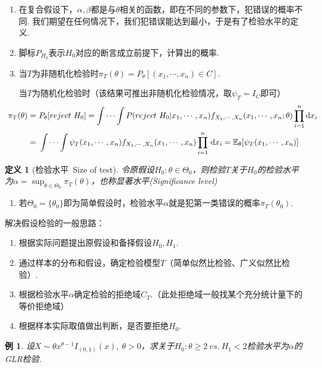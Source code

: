 \documentclass[12pt, a4paper, oneside]{ctexart}
\newtheorem{example}{例}[section]  %
\newtheorem{definition}[theorem]{定义}
\numberwithin{equation}{section}  %
\newenvironment{remark}{\begin{enumerate}[label=\textbf{注\arabic*.}]}{\end{enumerate}}
\let\geq=\geqslant %
\def\E{\mathbb{E}}          %
\def\d{\mathrm{d}}          %
\begin{document}
\begin{remark}
    \item 在复合假设下，$\alpha,\beta$都是与$\theta$相关的函数，即在不同的参数下，犯错误的概率不同. 我们期望在任何情况下，我们犯错误能达到最小，于是有了检验水平的定义.
    \item 脚标$P_{H_0}$表示$H_0$对应的断言成立前提下，计算出的概率.
    \item 当$T$为非随机化检验时$\pi_T(\theta) = P_\theta[(x_1,\cdots,x_n)\in C]$.
   
    当$T$为随机化检验时（该结果可推出非随机化检验情况，取$\psi_{T} = I_{C}$即可）
    \begin{align*}
        \hspace*{-0.5cm}
        \pi_T(\theta) =&\ P_\theta[reject\ H_0] = \int\cdots\int P(reject\ H_0|x_1,\cdots,x_n)f_{X_1,\cdots,X_n}(x_1,\cdots,x_n;\theta)\prod_{i=1}^n\d x_i\\
        =&\ \int\cdots\int\psi_T(x_1,\cdots,x_n)f_{X_1,\cdots,X_n}(x_1,\cdots,x_n)\prod_{i=1}^n\,\d x_i = \E_\theta[\psi_T(x_1,\cdots,x_n)]
    \end{align*}
\end{remark}
\begin{definition}[检验水平\ Size of test]
    令原假设$H_0:\theta\in\Theta_0$，则检验$T$关于$H_0$的检验水平为$\alpha=\sup_{\theta\in\Theta_0}\pi_T(\theta)$，也称显著水平(Significance level)
\end{definition}
\begin{remark}
    \item 若$\Theta_0=\{\theta_0\}$即为简单假设时，检验水平$\alpha$就是犯第一类错误的概率$\pi_T(\theta_0)$.
\end{remark}
解决假设检验的一般思路：
\begin{enumerate}
    \item 根据实际问题提出原假设和备择假设$H_0,H_1$.
    \item 通过样本的分布和假设，确定检验模型$T$（简单似然比检验、广义似然比检验）.
    \item 根据检验水平$\alpha$确定检验的拒绝域$C_T$.（此处拒绝域一般找某个充分统计量下的等价拒绝域）
    \item 根据样本实际取值做出判断，是否要拒绝$H_0$.
\end{enumerate}
\begin{example}
    设$X\sim \theta x^{\theta-1}I_{(0,1)}(x),\ \theta > 0$，求关于$H_0:\theta\geq 2\ vs.\ H_1<2$检验水平为$\alpha$的GLR检验.
\end{example}
\end{document}
